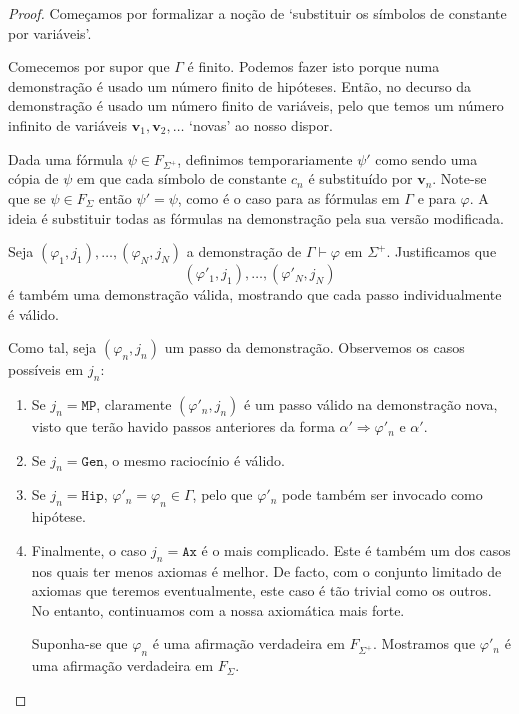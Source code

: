 \documentclass{report}
\theoremstyle{definition}
\theoremstyle{remark}
\renewcommand{\bf}[1]{\mathbf{#1}}
\newcommand{\imply}{\mathbin{\Rightarrow}}
\begin{document}
	\begin{proof}
	Começamos por formalizar a noção de `substituir os símbolos de constante por variáveis'.
	
	Comecemos por supor que $\Gamma$ é finito. Podemos fazer isto porque numa demonstração é usado um número finito de hipóteses. Então, no decurso da demonstração é usado um número finito de variáveis, pelo que temos um número infinito de variáveis $\bf v_1, \bf v_2, \dots$ `novas' ao nosso dispor.
	
	Dada uma fórmula $\psi \in F_{\Sigma^+}$, definimos temporariamente $\psi'$ como sendo uma cópia de $\psi$ em que cada símbolo de constante $c_n$ é substituído por $\bf v_n$. Note-se que se $\psi \in F_\Sigma$ então $\psi' = \psi$, como é o caso para as fórmulas em $\Gamma$ e para $\varphi$. A ideia é substituir todas as fórmulas na demonstração pela sua versão modificada.
	
	Seja $(\varphi_1, j_1), \dots, (\varphi_N, j_N)$ a demonstração de $\Gamma \vdash \varphi$ em $\Sigma^+$. Justificamos que
	\[(\varphi'_1, j_1), \dots, (\varphi'_N, j_N)\]
	é também uma demonstração válida, mostrando que cada passo individualmente é válido.
	
	Como tal, seja $(\varphi_n, j_n)$ um passo da demonstração. Observemos os casos possíveis em $j_n$:
	
	\begin{enumerate}
	\item Se $j_n = \mathtt{MP}$, claramente $(\varphi'_n, j_n)$ é um passo válido na demonstração nova, visto que terão havido passos anteriores da forma $\alpha' \imply \varphi'_n$ e $\alpha'$.
	
	\item Se $j_n = \mathtt{Gen}$, o mesmo raciocínio é válido.
	
	\item Se $j_n = \mathtt{Hip}$, $\varphi'_n = \varphi_n \in \Gamma$, pelo que $\varphi'_n$ pode também ser invocado como hipótese.
	
	\item Finalmente, o caso $j_n = \mathtt{Ax}$ é o mais complicado. Este é também um dos casos nos quais ter menos axiomas é melhor. De facto, com o conjunto limitado de axiomas que teremos eventualmente, este caso é tão trivial como os outros. No entanto, continuamos com a nossa axiomática mais forte.
	
	Suponha-se que $\varphi_n$ é uma afirmação verdadeira em $F_{\Sigma^+}$. Mostramos que $\varphi'_n$ é uma afirmação verdadeira em $F_\Sigma$.
	

\end{enumerate}
\end{proof}
\end{document}
